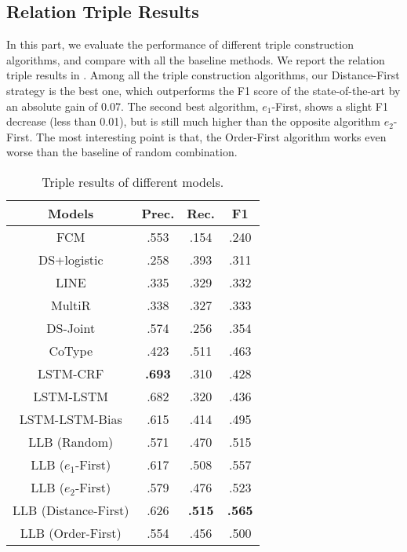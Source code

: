 \subsection{Relation Triple Results}
In this part, we evaluate the performance of different triple construction algorithms,
and compare with all the baseline methods.
We report the relation triple results in .
Among all the triple construction algorithms, our Distance-First strategy is the best one,
which outperforms the F1 score of the state-of-the-art by an absolute gain of 0.07.
The second best algorithm, $e_1$-First, shows a slight F1 decrease (less than 0.01),
but is still much higher than the opposite algorithm $e_2$-First.
The most interesting point is that, the Order-First algorithm works even worse than
the baseline of random combination.


\begin{table}[ht]
  \small
  \caption{Triple results of different models.}
  \label{tab:e2e}
  \begin{center}
    \begin{tabular}{cccc}
      \hline
      \bf Models & \bf Prec. & \bf Rec. & \bf F1 \\
      \hline
      FCM & .553 & .154 & .240 \\
      DS+logistic & .258 & .393 & .311 \\
      LINE & .335 & .329 & .332 \\
      \hline
      MultiR & .338 & .327 & .333 \\
      DS-Joint & .574 & .256 & .354 \\
      CoType & .423 & .511 & .463 \\
      \hline
      LSTM-CRF & \textbf{.693} & .310 & .428 \\
      LSTM-LSTM & .682 & .320 & .436 \\
      LSTM-LSTM-Bias & .615 & .414 & .495 \\
      \hline
      LLB (Random) & .571 & .470 & .515 \\
      LLB ($e_1$-First) & .617 & .508 & .557 \\
      LLB ($e_2$-First) & .579 & .476 & .523 \\
      LLB (Distance-First) & .626 & \textbf{.515} &\textbf{.565} \\
      LLB (Order-First) & .554 & .456 & .500 \\
      \hline
    \end{tabular}
  \end{center}
\end{table}



